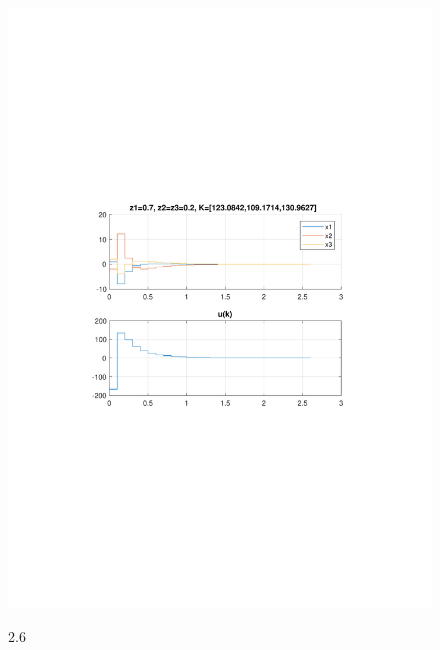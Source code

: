 \documentclass{article}
\begin{document}
{\begin{figure}[H]
\includegraphics[clip, trim=0.5cm 9.5cm 0.5cm 9.5cm, width=1.00\textwidth]{../rys/zad3b_rys6.pdf}
\label{fig:rys3.2.6}
\caption{2.6}
\end{figure}
}
\end{document}
